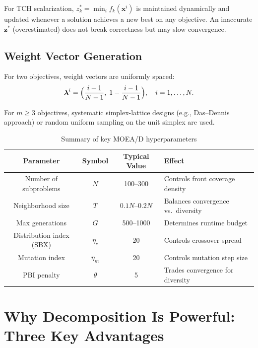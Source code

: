 \documentclass[12pt,a4paper]{article}
\begin{document}
For TCH scalarization, $z_k^* = \min_i f_k(\mathbf{x}^i)$ is maintained dynamically and updated whenever a solution achieves a new best on any objective. An inaccurate $\mathbf{z}^*$ (overestimated) does not break correctness but may slow convergence.

\subsection{Weight Vector Generation}

For two objectives, weight vectors are uniformly spaced:
\begin{equation}
    \boldsymbol{\lambda}^i = \Bigl(\frac{i-1}{N-1},\; 1 - \frac{i-1}{N-1}\Bigr), \quad i = 1, \ldots, N.
\end{equation}

For $m \geq 3$ objectives, systematic simplex-lattice designs (e.g., Das--Dennis approach) or random uniform sampling on the unit simplex are used.

\begin{table}[H]
\centering
\caption{Summary of key MOEA/D hyperparameters}
\label{tab:hyperparams}
\renewcommand{\arraystretch}{1.4}
\begin{tabular}{cccp{5cm}}
\toprule
\textbf{Parameter} & \textbf{Symbol} & \textbf{Typical Value} & \textbf{Effect} \\
\midrule
Number of subproblems & $N$ & 100--300 & Controls front coverage density \\
Neighborhood size & $T$ & $0.1N$--$0.2N$ & Balances convergence vs.\ diversity \\
Max generations & $G$ & 500--1000 & Determines runtime budget \\
Distribution index (SBX) & $\eta_c$ & 20 & Controls crossover spread \\
Mutation index & $\eta_m$ & 20 & Controls mutation step size \\
PBI penalty & $\theta$ & 5 & Trades convergence for diversity \\
\bottomrule
\end{tabular}
\end{table}

\section{Why Decomposition Is Powerful: Three Key Advantages}
\label{sec:advantages}
\end{document}
